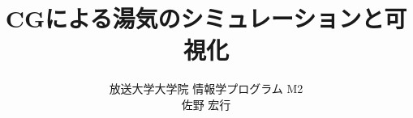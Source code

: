 \usepackage[dvipdfmx]{graphicx}
\usepackage[margin=30mm]{geometry}
\usepackage{url}


\title{CGによる湯気のシミュレーションと可視化}
\author{放送大学大学院 情報学プログラム M2\\ 佐野 宏行}
\maketitle